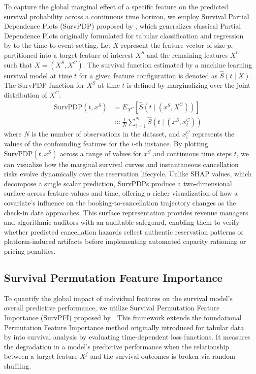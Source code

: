 \documentclass[pdflatex,iicol,sn-mathphys-ay]{sn-jnl}
\theoremstyle{thmstyleone}%
\theoremstyle{thmstyletwo}%
\theoremstyle{thmstylethree}%
\begin{document}
To capture the global marginal effect of a specific feature on the predicted survival probability across a continuous time horizon, we employ Survival Partial Dependence Plots (SurvPDP) proposed by \cite{langbein2025interpretable}, which generalizes classical Partial Dependence Plots originally formulated for tabular classification and regression by \cite{friedman2001greedy} to the time-to-event setting. Let $X$ represent the feature vector of size $p$, partitioned into a target feature of interest $X^S$ and the remaining features $X^C$ such that $X = (X^S, X^C)$. The survival function estimated by a machine learning survival model at time $t$ for a given feature configuration is denoted as $\hat{S}(t \mid X)$. The SurvPDP function for $X^S$ at time $t$ is defined by marginalizing over the joint distribution of $X^C$:
\begin{align}
\text{SurvPDP}(t, x^S) &= E_{X^C} \left[ \hat{S}(t \mid (x^S, X^C)) \right] \nonumber \\
            &\approx \frac{1}{N} \sum_{i=1}^N \hat{S}\left(t \mid (x^S, x_i^C)\right)
\end{align}
where $N$ is the number of observations in the dataset, and $x_i^C$ represents the values of the confounding features for the $i$-th instance. By plotting $\text{SurvPDP}(t, x^S)$ across a range of values for $x^S$ and continuous time steps $t$, we can visualize how the marginal survival curves and instantaneous cancellation risks evolve dynamically over the reservation lifecycle. Unlike SHAP values, which decompose a single scalar prediction, SurvPDPs produce a two-dimensional surface across feature values and time, offering a richer visualization of how a covariate's influence on the booking-to-cancellation trajectory changes as the check-in date approaches. This surface representation provides revenue managers and algorithmic auditors with an auditable safeguard, enabling them to verify whether predicted cancellation hazards reflect authentic reservation patterns or platform-induced artifacts before implementing automated capacity rationing or pricing penalties.

\subsection{Survival Permutation Feature Importance}

To quantify the global impact of individual features on the survival model's overall predictive performance, we utilize Survival Permutation Feature Importance (SurvPFI) proposed by \cite{langbein2025interpretable}. This framework extends the foundational Permutation Feature Importance method originally introduced for tabular data by \cite{breiman2001random} into survival analysis by evaluating time-dependent loss functions. It measures the degradation in a model's predictive performance when the relationship between a target feature $X^j$ and the survival outcomes is broken via random shuffling.
\end{document}

